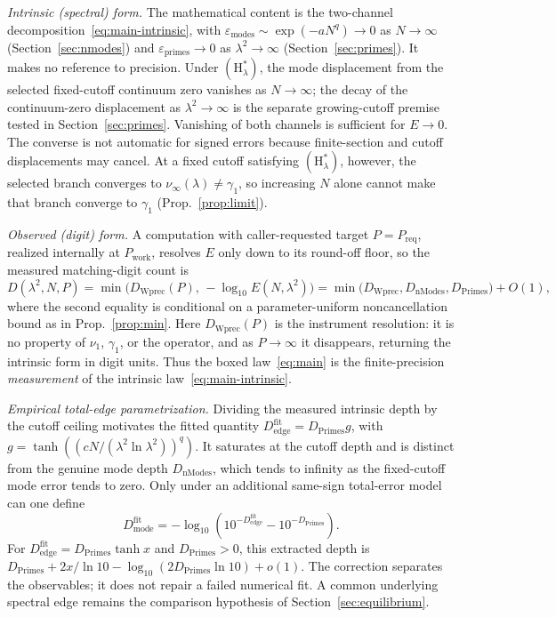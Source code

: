 \documentclass[11pt,a4paper]{article}
\begin{document}
\smallskip
\noindent\emph{Intrinsic (spectral) form.} The mathematical content is the
two-channel decomposition~\eqref{eq:main-intrinsic}, with
$\varepsilon_{\mathrm{modes}}\sim
\exp(-aN^{q})\to0$ as $N\to\infty$ (Section~\ref{sec:nmodes}) and
$\varepsilon_{\mathrm{primes}}\to0$ as $\lambda^2\to\infty$
(Section~\ref{sec:primes}). It makes no reference to precision. Under
$(\mathrm{H}_\lambda^\ast)$, the mode displacement from the selected
fixed-cutoff continuum zero vanishes as $N\to\infty$; the decay of the
continuum-zero displacement as $\lambda^2\to\infty$ is the separate
growing-cutoff premise tested in Section~\ref{sec:primes}. Vanishing of both
channels is sufficient for $E\to0$. The converse is not automatic for signed
errors because finite-section and cutoff displacements may cancel. At a fixed
cutoff satisfying $(\mathrm{H}_\lambda^\ast)$, however, the selected branch
converges to $\nu_\infty(\lambda)\ne\gamma_1$, so increasing $N$ alone cannot
make that branch converge to $\gamma_1$ (Prop.~\ref{prop:limit}).

\smallskip
\noindent\emph{Observed (digit) form.} A computation with caller-requested target
$P=P_{\mathrm{req}}$, realized internally at $P_{\mathrm{work}}$, resolves $E$ only down to its round-off floor, so the measured matching-digit
count is
\begin{equation}\label{eq:observed}
  D(\lambda^2,N,P)=\min\!\bigl(D_{\mathrm{Wprec}}(P),\,-\log_{10}E(N,\lambda^2)\bigr)
   =\min\!\bigl(D_{\mathrm{Wprec}},D_{\mathrm{nModes}},D_{\mathrm{Primes}}\bigr)+O(1),
\end{equation}
where the second equality is conditional on a parameter-uniform
noncancellation bound as in Prop.~\ref{prop:min}. Here $D_{\mathrm{Wprec}}(P)$
is the instrument resolution: it is no property of $\nu_1$, $\gamma_1$, or the
operator, and as $P\to\infty$ it disappears, returning the intrinsic form in
digit units. Thus the boxed law~\eqref{eq:main} is the finite-precision
\emph{measurement} of the intrinsic law~\eqref{eq:main-intrinsic}.

\smallskip
\noindent\emph{Empirical total-edge parametrization.} Dividing the measured
intrinsic depth by the cutoff ceiling motivates the fitted quantity
$D_{\mathrm{edge}}^{\mathrm{fit}}=D_{\mathrm{Primes}}g$, with
$g=\tanh((cN/(\lambda^2\ln\lambda^2))^q)$. It saturates at the cutoff
depth and is distinct from the genuine mode depth $D_{\mathrm{nModes}}$,
which tends to infinity as the fixed-cutoff mode error tends to zero.
Only under an additional same-sign total-error model can one define
\[
 D_{\mathrm{mode}}^{\mathrm{fit}}
 =-\log_{10}\!\left(10^{-D_{\mathrm{edge}}^{\mathrm{fit}}}
                         -10^{-D_{\mathrm{Primes}}}\right).
\]
For $D_{\mathrm{edge}}^{\mathrm{fit}}=D_{\mathrm{Primes}}\tanh x$ and
$D_{\mathrm{Primes}}>0$, this extracted depth is
$D_{\mathrm{Primes}}+2x/\ln10-\log_{10}(2D_{\mathrm{Primes}}\ln10)+o(1)$.
The correction separates the observables; it does not repair a failed
numerical fit. A common underlying spectral edge remains the comparison
hypothesis of Section~\ref{sec:equilibrium}.
\end{document}
